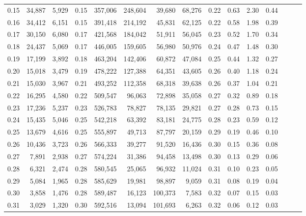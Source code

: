 \begin{tabular}{rrrrrrrrrrrrrrr}
0.15 &  34,887 &  5,929 &  0.15 &  357,006 &  248,604 &   39,680 &   68,276 &  0.22 &  0.63 &  2.30 &      0.44 \\
0.16 &  34,412 &  6,151 &  0.15 &  391,418 &  214,192 &   45,831 &   62,125 &  0.22 &  0.58 &  1.98 &      0.39 \\
0.17 &  30,150 &  6,080 &  0.17 &  421,568 &  184,042 &   51,911 &   56,045 &  0.23 &  0.52 &  1.70 &      0.34 \\
0.18 &  24,437 &  5,069 &  0.17 &  446,005 &  159,605 &   56,980 &   50,976 &  0.24 &  0.47 &  1.48 &      0.30 \\
0.19 &  17,199 &  3,892 &  0.18 &  463,204 &  142,406 &   60,872 &   47,084 &  0.25 &  0.44 &  1.32 &      0.27 \\
0.20 &  15,018 &  3,479 &  0.19 &  478,222 &  127,388 &   64,351 &   43,605 &  0.26 &  0.40 &  1.18 &      0.24 \\
0.21 &  15,030 &  3,967 &  0.21 &  493,252 &  112,358 &   68,318 &   39,638 &  0.26 &  0.37 &  1.04 &      0.21 \\
0.22 &  16,295 &  4,580 &  0.22 &  509,547 &   96,063 &   72,898 &   35,058 &  0.27 &  0.32 &  0.89 &      0.18 \\
0.23 &  17,236 &  5,237 &  0.23 &  526,783 &   78,827 &   78,135 &   29,821 &  0.27 &  0.28 &  0.73 &      0.15 \\
0.24 &  15,435 &  5,046 &  0.25 &  542,218 &   63,392 &   83,181 &   24,775 &  0.28 &  0.23 &  0.59 &      0.12 \\
0.25 &  13,679 &  4,616 &  0.25 &  555,897 &   49,713 &   87,797 &   20,159 &  0.29 &  0.19 &  0.46 &      0.10 \\
0.26 &  10,436 &  3,723 &  0.26 &  566,333 &   39,277 &   91,520 &   16,436 &  0.30 &  0.15 &  0.36 &      0.08 \\
0.27 &   7,891 &  2,938 &  0.27 &  574,224 &   31,386 &   94,458 &   13,498 &  0.30 &  0.13 &  0.29 &      0.06 \\
0.28 &   6,321 &  2,474 &  0.28 &  580,545 &   25,065 &   96,932 &   11,024 &  0.31 &  0.10 &  0.23 &      0.05 \\
0.29 &   5,084 &  1,965 &  0.28 &  585,629 &   19,981 &   98,897 &    9,059 &  0.31 &  0.08 &  0.19 &      0.04 \\
0.30 &   3,858 &  1,476 &  0.28 &  589,487 &   16,123 &  100,373 &    7,583 &  0.32 &  0.07 &  0.15 &      0.03 \\
0.31 &   3,029 &  1,320 &  0.30 &  592,516 &   13,094 &  101,693 &    6,263 &  0.32 &  0.06 &  0.12 &      0.03 \\

\end{tabular}
